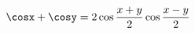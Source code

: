 \documentclass[preview]{standalone}
\begin{document}
\begin{align*}
\cosx + \cosy = 2 \cos\frac{x+y}{2}\cos\frac{x-y}{2}
\end{align*}
\end{document}
